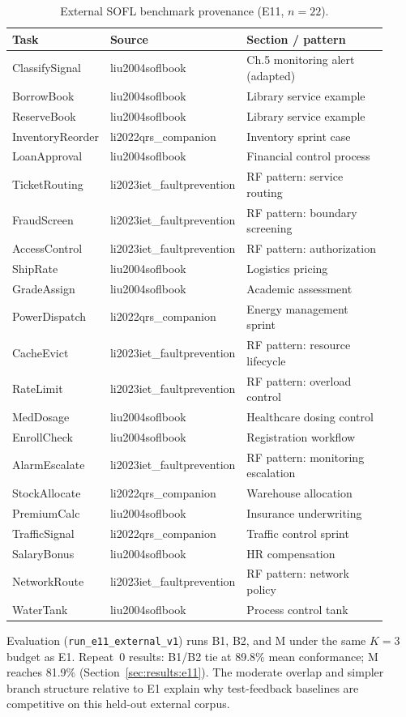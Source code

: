 \begin{table}[htbp]
  \caption{External SOFL benchmark provenance (E11, $n{=}22$).}
  \label{tab:bench:e11-provenance}
  \centering
  \footnotesize
  \renewcommand{\arraystretch}{1.05}
  \begin{tabular}{@{}p{0.22\linewidth}p{0.28\linewidth}p{0.42\linewidth}@{}}
    \toprule
    Task & Source & Section / pattern \\
    \midrule
    ClassifySignal & liu2004soflbook & Ch.5 monitoring alert (adapted) \\
    BorrowBook & liu2004soflbook & Library service example \\
    ReserveBook & liu2004soflbook & Library service example \\
    InventoryReorder & li2022qrs\_companion & Inventory sprint case \\
    LoanApproval & liu2004soflbook & Financial control process \\
    TicketRouting & li2023iet\_faultprevention & RF pattern: service routing \\
    FraudScreen & li2023iet\_faultprevention & RF pattern: boundary screening \\
    AccessControl & li2023iet\_faultprevention & RF pattern: authorization \\
    ShipRate & liu2004soflbook & Logistics pricing \\
    GradeAssign & liu2004soflbook & Academic assessment \\
    PowerDispatch & li2022qrs\_companion & Energy management sprint \\
    CacheEvict & li2023iet\_faultprevention & RF pattern: resource lifecycle \\
    RateLimit & li2023iet\_faultprevention & RF pattern: overload control \\
    MedDosage & liu2004soflbook & Healthcare dosing control \\
    EnrollCheck & liu2004soflbook & Registration workflow \\
    AlarmEscalate & li2023iet\_faultprevention & RF pattern: monitoring escalation \\
    StockAllocate & li2022qrs\_companion & Warehouse allocation \\
    PremiumCalc & liu2004soflbook & Insurance underwriting \\
    TrafficSignal & li2022qrs\_companion & Traffic control sprint \\
    SalaryBonus & liu2004soflbook & HR compensation \\
    NetworkRoute & li2023iet\_faultprevention & RF pattern: network policy \\
    WaterTank & liu2004soflbook & Process control tank \\
    \bottomrule
  \end{tabular}
\end{table}

Evaluation (\texttt{run\_e11\_external\_v1}) runs B1, B2, and M under the
same $K{=}3$ budget as E1.
Repeat~0 results: B1/B2 tie at 89.8\% mean conformance; M reaches 81.9\%
(Section~\ref{sec:results:e11}).
The moderate overlap and simpler branch structure relative to E1 explain why
test-feedback baselines are competitive on this held-out external corpus.
